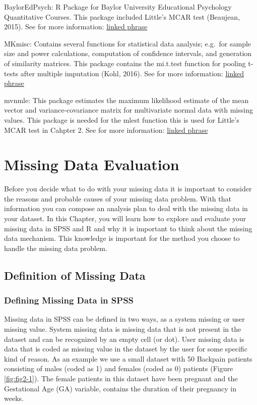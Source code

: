 \documentclass[]{book}
\theoremstyle{definition}
\theoremstyle{definition}
\theoremstyle{definition}
\theoremstyle{remark}
\begin{document}
BaylorEdPsych: R Package for Baylor University Educational Psychology
Quantitative Courses. This package included Little's MCAR test
(Beaujean, 2015). See for more information:
\href{https://cran.r-project.org/web/packages/BaylorEdPsych/index.html}{linked
phrase}

MKmisc: Contains several functions for statistical data analysis;
e.g.~for sample size and power calculations, computation of confidence
intervals, and generation of similarity matrices. This package contains
the mi.t.test function for pooling t-tests after multiple imputation
(Kohl, 2016). See for more information:
\href{https://cran.r-project.org/web/packages/MKmisc/index.html}{linked
phrase}

mvnmle: This package estimates the maximum likelihood estimate of the
mean vector and variance-covariance matrix for multivariate normal data
with missing values. This package is needed for the mlest function this
is used for Little's MCAR test in Cahpter 2. See for more information:
\href{https://cran.r-project.org/web/packages/mvnmle/index.html}{linked
phrase}

\chapter{Missing Data Evaluation}\label{missing-data-evaluation}

Before you decide what to do with your missing data it is important to
consider the reasons and probable causes of your missing data problem.
With that information you can compose an analysis plan to deal with the
missing data in your dataset. In this Chapter, you will learn how to
explore and evaluate your missing data in SPSS and R and why it is
important to think about the missing data mechanism. This knowledge is
important for the method you choose to handle the missing data problem.

\section{Definition of Missing Data}\label{definition-of-missing-data}

\subsection{Defining Missing Data in
SPSS}\label{defining-missing-data-in-spss}

Missing data in SPSS can be defined in two ways, as a system missing or
user missing value. System missing data is missing data that is not
present in the dataset and can be recognized by an empty cell (or dot).
User missing data is data that is coded as missing value in the dataset
by the user for some specific kind of reason. As an example we use a
small dataset with 50 Backpain patients consisting of males (coded as 1)
and females (coded as 0) patients (Figure \ref{fig:fig2-1}). The female
patients in this dataset have been pregnant and the Gestational Age (GA)
variable, contains the duration of their pregnancy in weeks.
\end{document}
